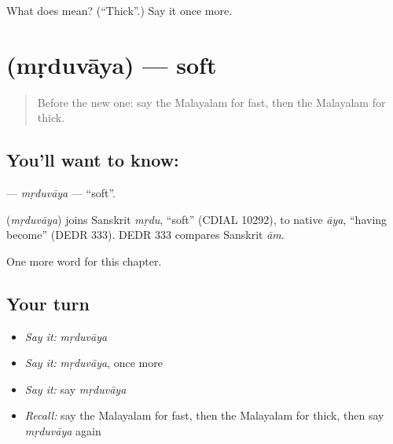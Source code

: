 \begin{tcolorbox}[breakable,colback=teal!4,colframe=teal!35!black,title={Before you move on}]
What does  mean? (\textquotedblleft{}Thick\textquotedblright{}.) Say it once more.
\end{tcolorbox}
\section[\texorpdfstring{\ml{മൃദുവായ} (mṛduvāya)}{മൃദുവായ (mṛduvāya)}]{ (mṛduvāya) — soft}

\label{lesson:ML-C166-mrduvaya}



\begin{quote}
Before the new one: say the Malayalam for fast, then the Malayalam for thick.
\end{quote}

\subsection*{You'll want to know: }
\textbf{} — \emph{mṛduvāya} — \textquotedblleft{}soft\textquotedblright{}.

\begin{cousinweb}
\textbf{} (\emph{mṛduvāya}) joins Sanskrit \emph{mṛdu}, \textquotedblleft{}soft\textquotedblright{} (CDIAL 10292), to native \emph{āya}, \textquotedblleft{}having become\textquotedblright{} (DEDR 333). DEDR 333 compares Sanskrit \emph{ām}.
\end{cousinweb}

\begin{grammarlens}[title={What you've built}]
One more word for this chapter.
\end{grammarlens}

\subsection*{Your turn}
\begin{itemize}
\raggedright
  \item \emph{Say it:} \emph{mṛduvāya}
  \item \emph{Say it:} \emph{mṛduvāya}, once more
  \item \emph{Say it:} say \emph{mṛduvāya}
  \item \emph{Recall:} say the Malayalam for fast, then the Malayalam for thick, then say \emph{mṛduvāya} again
\end{itemize}

